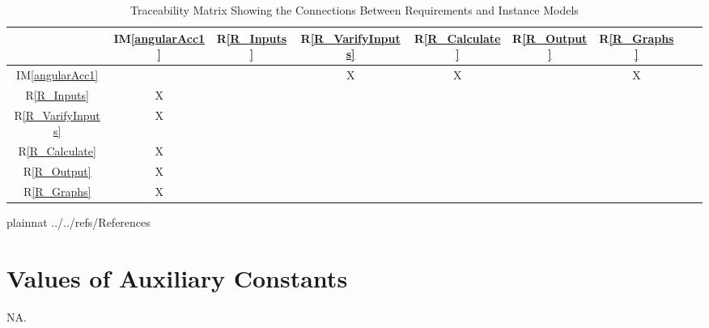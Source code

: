 \documentclass[12pt]{article}
\newcommand{\iref}[1]{IM\ref{#1}}
\newcommand{\rref}[1]{R\ref{#1}}
\begin{document}
\begin{table}[H]
\centering
\begin{tabular}{|c|c|c|c|c|c|c|c|c|}
\hline
  &\iref{angularAcc1}& \rref{R_Inputs}& \rref{R_VarifyInputs} &  \rref{R_Calculate} & \rref{R_Output} & \rref{R_Graphs}\\
\hline
\iref{angularAcc1}         &&&X&X&&X\\ \hline
\rref{R_Inputs}         &X&&&&&\\ \hline
\rref{R_VarifyInputs}         &X&&&&&\\ \hline
\rref{R_Calculate}     &X&&&&&\\ \hline
\rref{R_Output}    &X&&&&&\\  
\rref{R_Graphs}    &X&&&&&\\
\hline
\end{tabular}
\caption{Traceability Matrix Showing the Connections Between Requirements and Instance Models}
\label{Table:R_trace}
\end{table}

\newpage

 {plainnat}
 {../../refs/References}

\newpage


\section{Values of Auxiliary Constants}\label{sec_auxConst}

NA.
\end{document}
